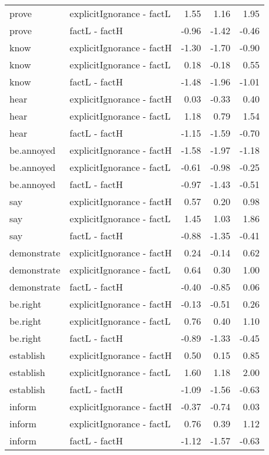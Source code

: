 \begin{longtable}{llrrr}
  prove & explicitIgnorance - factL & 1.55 & 1.16 & 1.95 \\ 
  prove & factL - factH & -0.96 & -1.42 & -0.46 \\ 
  know & explicitIgnorance - factH & -1.30 & -1.70 & -0.90 \\ 
  know & explicitIgnorance - factL & 0.18 & -0.18 & 0.55 \\ 
  know & factL - factH & -1.48 & -1.96 & -1.01 \\ 
  hear & explicitIgnorance - factH & 0.03 & -0.33 & 0.40 \\ 
  hear & explicitIgnorance - factL & 1.18 & 0.79 & 1.54 \\ 
  hear & factL - factH & -1.15 & -1.59 & -0.70 \\ 
  be.annoyed & explicitIgnorance - factH & -1.58 & -1.97 & -1.18 \\ 
  be.annoyed & explicitIgnorance - factL & -0.61 & -0.98 & -0.25 \\ 
  be.annoyed & factL - factH & -0.97 & -1.43 & -0.51 \\ 
  say & explicitIgnorance - factH & 0.57 & 0.20 & 0.98 \\ 
  say & explicitIgnorance - factL & 1.45 & 1.03 & 1.86 \\ 
  say & factL - factH & -0.88 & -1.35 & -0.41 \\ 
  demonstrate & explicitIgnorance - factH & 0.24 & -0.14 & 0.62 \\ 
  demonstrate & explicitIgnorance - factL & 0.64 & 0.30 & 1.00 \\ 
  demonstrate & factL - factH & -0.40 & -0.85 & 0.06 \\ 
  be.right & explicitIgnorance - factH & -0.13 & -0.51 & 0.26 \\ 
  be.right & explicitIgnorance - factL & 0.76 & 0.40 & 1.10 \\ 
  be.right & factL - factH & -0.89 & -1.33 & -0.45 \\ 
  establish & explicitIgnorance - factH & 0.50 & 0.15 & 0.85 \\ 
  establish & explicitIgnorance - factL & 1.60 & 1.18 & 2.00 \\ 
  establish & factL - factH & -1.09 & -1.56 & -0.63 \\ 
  inform & explicitIgnorance - factH & -0.37 & -0.74 & 0.03 \\ 
  inform & explicitIgnorance - factL & 0.76 & 0.39 & 1.12 \\ 
  inform & factL - factH & -1.12 & -1.57 & -0.63 \\ 

\end{longtable}

